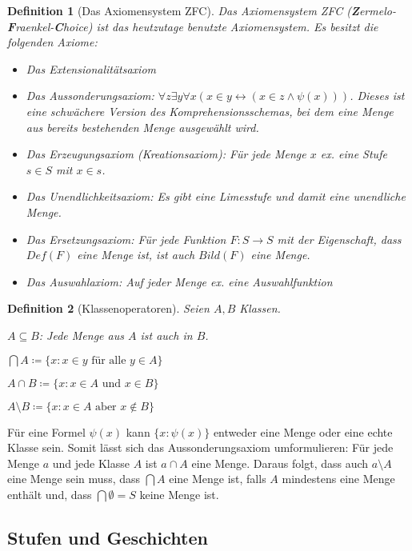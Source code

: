 \documentclass[german]{article}
\theoremstyle{break}
\theoremstyle{def_style}
\newtheorem{definition}{Definition}
\theoremstyle{def_style}
\begin{document}
\begin{definition}[Das Axiomensystem ZFC]
	Das Axiomensystem ZFC (\textbf{Z}ermelo-\textbf{F}raenkel-\textbf{C}hoice) ist das heutzutage benutzte Axiomensystem. Es besitzt die folgenden Axiome:
	\begin{itemize}
		\item Das Extensionalitätsaxiom
		\item Das Aussonderungsaxiom: $\forall z \exists y \forall x (x\in y \leftrightarrow(x\in z \land \psi(x)))$. Dieses ist eine schwächere Version des Komprehensionsschemas, bei dem eine Menge aus bereits bestehenden Menge ausgewählt wird.
		\item Das Erzeugungsaxiom (Kreationsaxiom): Für jede Menge $x$ ex. eine \textit{Stufe} $s\in S$ mit $x\in s$.
		\item Das Unendlichkeitsaxiom: Es gibt eine \textit{Limesstufe} und damit eine unendliche Menge.
		\item Das Ersetzungsaxiom: Für jede Funktion $F:S\to S$ mit der Eigenschaft, dass $Def(F)$ eine Menge ist, ist auch $Bild(F)$ eine Menge.
		\item Das Auswahlaxiom: Auf jeder Menge ex. eine \textit{Auswahlfunktion}
	\end{itemize}
\end{definition}

\begin{definition}[Klassenoperatoren]
	Seien $A, B$ Klassen.
	
	$A \subseteq B$: Jede Menge aus $A$ ist auch in $B$.
	
	$\bigcap A\coloneqq\{x : x\in y \text{ für alle } y \in A\}$
	
	$A \cap B \coloneqq \{x : x\in A \text{ und } x \in B\}$
	
	$A \setminus B \coloneqq \{x : x \in A \text{ aber } x \notin B\}$
\end{definition}

Für eine Formel $\psi(x)$ kann $\{x : \psi(x)\}$ entweder eine Menge oder eine echte Klasse sein. Somit lässt sich das Aussonderungsaxiom umformulieren: Für jede Menge $a$ und jede Klasse $A$ ist $a \cap A$ eine Menge. Daraus folgt, dass auch $a \setminus A$ eine Menge sein muss, dass $\bigcap A$ eine Menge ist, falls $A$ mindestens eine Menge enthält und, dass $\bigcap \emptyset = S$ keine Menge ist.

\subsection{Stufen und Geschichten}
\end{document}
